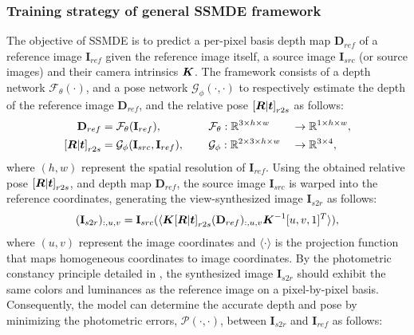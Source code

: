 \subsubsection{Training strategy of general SSMDE framework}
\label{sec:problem_definition}
The objective of SSMDE is to predict a per-pixel basis depth map $\mathbf{D}_{ref}$ of a reference image $\mathbf{I}_{ref}$ given the reference image itself, a source image $\mathbf{I}_{src}$ (or source images) and their camera intrinsics $\displaystyle {\bm{K}}$.
The framework consists of a depth network $\mathcal{F}_{\theta}(\cdot)$, and a pose network $\mathcal{G}_{\phi}(\cdot, \cdot)$ to respectively estimate the depth of the reference image $\mathbf{D}_{ref}$, and the relative pose ${[{\displaystyle {\bm{R}}}|{\displaystyle {\bm{t}}}]}_{r2s}$ as follows:
\begin{alignat}{3}
\label{eq:forward}
    \mathbf{D}_{ref} &= \mathcal{F}_{\theta}(\mathbf{I}_{ref}),\quad &&~\mathcal{F}_{\theta}:\mathbb{R}^{3 \times h \times w} &&\rightarrow \mathbb{R}^{1 \times h \times w},\\
    {[{\displaystyle {\bm{R}}}|{\displaystyle {\bm{t}}}]}_{r2s} &= \mathcal{G}_{\phi}(\mathbf{I}_{src}, \mathbf{I}_{ref}),\quad &&~\mathcal{G}_{\phi}:\mathbb{R}^{2 \times 3 \times h \times w} &&\rightarrow \mathbb{R}^{3 \times 4},
\end{alignat}
where $(h, w)$ represent the spatial resolution of $\mathbf{I}_{ref}$.
Using the obtained relative pose ${[{\displaystyle {\bm{R}}}|{\displaystyle {\bm{t}}}]}_{r2s}$, and depth map $\mathbf{D}_{ref}$, the source image $\mathbf{I}_{src}$ is warped into the reference coordinates, generating the view-synthesized image $\mathbf{I}_{s2r}$ as follows:
\begin{align}
\begin{split}
    \label{eq:warping}
    (\mathbf{I}_{s2r})_{:, u, v} = \mathbf{I}_{src}(\langle {\displaystyle {\bm{K}}}{[{\displaystyle {\bm{R}}}|{\displaystyle {\bm{t}}}]}_{r2s} (\mathbf{D}_{ref})_{:,u,v} {\displaystyle {\bm{K}}}^{-1}[u,v,1]^{T}\rangle),
    \end{split}
\end{align}
where $(u,v)$ represent the image coordinates and $\langle \cdot \rangle$ is the projection function that maps homogeneous coordinates to image coordinates.
By the photometric constancy principle detailed in , the synthesized image $\mathbf{I}_{s2r}$ should exhibit the same colors and luminances as the reference image on a pixel-by-pixel basis.
Consequently, the model can determine the accurate depth and pose by minimizing the photometric errors, $\mathcal{P}(\cdot, \cdot)$, between $\mathbf{I}_{s2r}$ and $\mathbf{I}_{ref}$ as follows:
